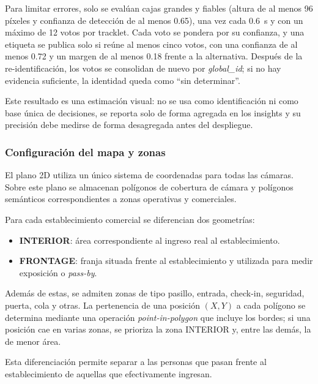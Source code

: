 \documentclass[12pt,letterpaper]{article}
\begin{document}
Para limitar errores, solo se evalúan cajas grandes y fiables (altura de
al menos 96 píxeles y confianza de detección de al menos 0.65), una vez
cada 0.6~s y con un máximo de 12 votos por tracklet. Cada voto se pondera
por su confianza, y una etiqueta se publica solo si reúne al menos cinco
votos, con una confianza de al menos 0.72 y un margen de al menos 0.18
frente a la alternativa. Después de la re-identificación, los votos se
consolidan de nuevo por \textit{global\_id}; si no hay evidencia
suficiente, la identidad queda como ``sin determinar''.

Este resultado es una estimación visual: no se usa como identificación
ni como base única de decisiones, se reporta solo de forma agregada en
los insights y su precisión debe medirse de forma desagregada antes del
despliegue.

\subsubsection{Configuración del mapa y zonas}

El plano 2D utiliza un único sistema de coordenadas para todas las
cámaras. Sobre este plano se almacenan polígonos de cobertura de cámara
y polígonos semánticos correspondientes a zonas operativas y
comerciales.

Para cada establecimiento comercial se diferencian dos geometrías:

\begin{itemize}
\item \textbf{INTERIOR}: área correspondiente al ingreso real al
establecimiento.

\item \textbf{FRONTAGE}: franja situada frente al establecimiento y
utilizada para medir exposición o \textit{pass-by}.
\end{itemize}

Además de estas, se admiten zonas de tipo pasillo, entrada, check-in,
seguridad, puerta, cola y otras. La pertenencia de una posición $(X,Y)$
a cada polígono se determina mediante una operación
\textit{point-in-polygon} que incluye los bordes; si una posición cae en
varias zonas, se prioriza la zona INTERIOR y, entre las demás, la de
menor área.

Esta diferenciación permite separar a las personas que pasan frente al
establecimiento de aquellas que efectivamente ingresan.

\end{document}
